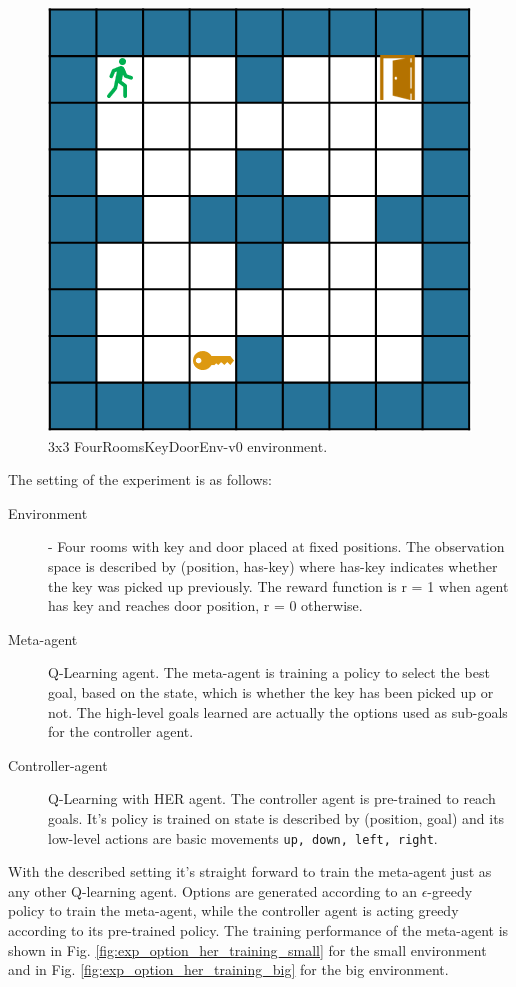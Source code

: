 \documentclass[conference]{IEEEtran}
\begin{document}
\begin{figure}[ht]
\centering
\includegraphics[width=0.5\columnwidth]{img/FourRoomsKeyDoorEnv-v0.png}
\caption{3x3 FourRoomsKeyDoorEnv-v0 environment.}
\label{fig:experiment_option_her_keydoor_env}
\end{figure}

The setting of the experiment is as follows:
\begin{description}
\item[Environment] - Four rooms with key and door placed at fixed positions. The observation space is described by (position, has-key) where has-key indicates whether the key was picked up previously. The reward function is r = 1 when agent has key and reaches door position, r = 0 otherwise.
\item[Meta-agent] Q-Learning agent. The meta-agent is training a policy to select the best goal, based on the state, which is whether the key has been picked up or not. The high-level goals learned are actually the options used as sub-goals for the controller agent. 
\item[Controller-agent] Q-Learning with HER agent. The controller agent is pre-trained to reach goals. It's policy is trained on  state is described by (position, goal) and its low-level actions are basic movements \texttt{up, down, left, right}.
\end{description}

With the described setting it's straight forward to train the meta-agent just as any other Q-learning agent. Options are generated according to an $\epsilon$-greedy policy to train the meta-agent, while the controller agent is acting greedy according to its pre-trained policy. The training performance of the meta-agent is shown in Fig. \ref{fig:exp_option_her_training_small} for the small environment and in Fig. \ref{fig:exp_option_her_training_big} for the big environment.
\end{document}
